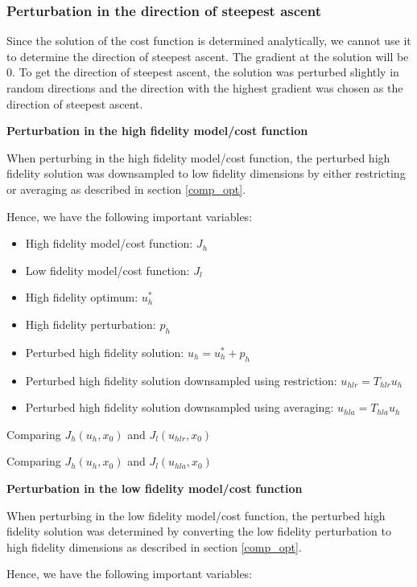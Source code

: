 \documentclass{article}
\begin{document}
\subsubsection{Perturbation in the direction of steepest ascent}

Since the solution of the cost function is determined analytically, we cannot use it to determine the direction of steepest ascent.
The gradient at the solution will be 0. To get the direction of steepest ascent, the solution was perturbed slightly in random directions and the direction with the highest gradient
was chosen as the direction of steepest ascent.

\textbf{Perturbation in the high fidelity model/cost function}

When perturbing in the high fidelity model/cost function, the perturbed high fidelity solution was downsampled to low fidelity
dimensions by either restricting or averaging as described in section \ref{comp_opt}.

Hence, we have the following important variables:

\begin{itemize}
  \item High fidelity model/cost function: $J_h$
  \item Low fidelity model/cost function: $J_l$
  \item High fidelity optimum: $u_h^*$
  \item High fidelity perturbation: $p_h$
  \item Perturbed high fidelity solution: $u_h = u_h^* + p_h$
  \item Perturbed high fidelity solution downsampled using restriction: $u_{hlr} = T_{hlr} u_h$
  \item Perturbed high fidelity solution downsampled using averaging: $u_{hla} = T_{hla} u_h$
\end{itemize}

Comparing $J_h(u_h, x_0)$ and $J_l(u_{hlr}, x_0)$

Comparing $J_h(u_h, x_0)$ and $J_l(u_{hla}, x_0)$

\textbf{Perturbation in the low fidelity model/cost function}

When perturbing in the low fidelity model/cost function, the perturbed high fidelity solution was determined
by converting the low fidelity perturbation to high fidelity dimensions as described in section \ref{comp_opt}.

Hence, we have the following important variables:
\end{document}
